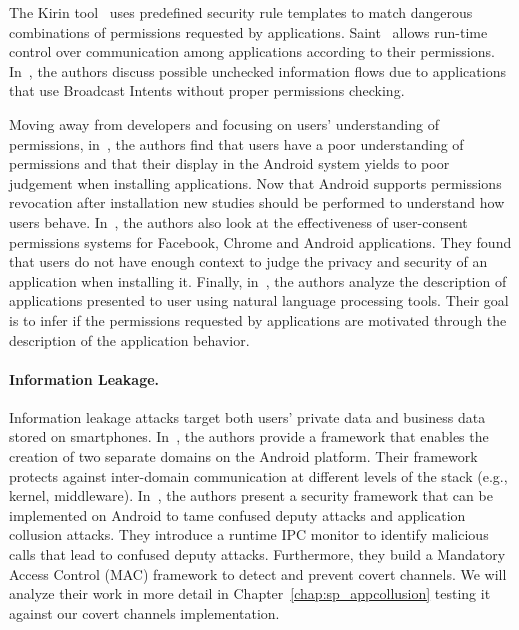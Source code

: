 The Kirin tool~\cite{Enck:2009:LMP:1653662.1653691} uses predefined security rule templates to match dangerous combinations of permissions requested by applications. Saint~\cite{App_centric_android_security} allows run-time control over communication among applications according to their permissions. In~\cite{androidsurgery}, the authors discuss possible unchecked information flows due to applications that use Broadcast Intents without proper permissions checking.

Moving away from developers and focusing on users' understanding of permissions, in~\cite{Felt12}, the authors find that users have a poor understanding of permissions and that their display in the Android system yields to poor judgement when installing applications. Now that Android supports permissions revocation after installation new studies should be performed to understand how users behave. In~\cite{Chia2012}, the authors also look at the effectiveness of user-consent permissions systems for Facebook, Chrome and Android applications. They found that users do not have enough context to judge the privacy and security of an application when installing it. Finally, in~\cite{whyper}, the authors analyze the description of applications presented to user using natural language processing tools. Their goal is to infer if the permissions requested by applications are motivated through the description of the application behavior.

\paragraph{Information Leakage.}

Information leakage attacks target both users' private data and business data stored on smartphones. In~\cite{Bugiel2011}, the authors provide a framework that enables the creation of two separate domains on the Android platform. Their framework protects against inter-domain communication at different levels of the stack (e.g., kernel, middleware). In~\cite{TUD-CS-2011-0127,newxmandroid}, the authors present a security framework that can be implemented on Android to tame confused deputy attacks and application collusion attacks. They introduce a runtime IPC monitor to identify malicious calls that lead to confused deputy attacks. Furthermore, they build a Mandatory Access Control (MAC) framework to detect and prevent covert channels. We will analyze their work in more detail in Chapter~\ref{chap:sp_appcollusion} testing it against our covert channels implementation.

